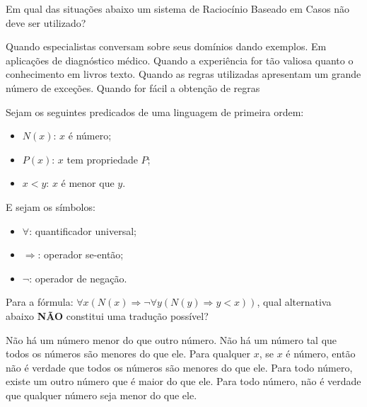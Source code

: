 \documentclass[12pt, addpoints]{exam}
\begin{document}
    \begin{questions}

    \newpage
    \question
Em qual das situações abaixo um sistema de Raciocínio Baseado em Casos não deve ser utilizado?

\begin{choices}
\choice Quando especialistas conversam sobre seus domínios dando exemplos.
\choice Em aplicações de diagnóstico médico.
\choice Quando a experiência for tão valiosa quanto o conhecimento em livros texto.
\choice Quando as regras utilizadas apresentam um grande número de exceções.
\choice Quando for fácil a obtenção de regras
\end{choices}

\question
Sejam os seguintes predicados de uma linguagem de primeira ordem:

\begin{itemize}
    \item \( N(x) \): \( x \) é número;
    \item \( P(x) \): \( x \) tem propriedade \( P \);
    \item \( x < y \): \( x \) é menor que \( y \).
\end{itemize}

E sejam os símbolos:
\begin{itemize}
    \item \( \forall \): quantificador universal;
    \item \( \Rightarrow \): operador se-então;
    \item \( \neg \): operador de negação.
\end{itemize}

Para a fórmula: \( \forall x (N(x) \Rightarrow \neg \forall y (N(y) \Rightarrow y < x)) \), qual alternativa abaixo \textbf{NÃO} constitui uma tradução possível?

\begin{choices}
\choice Não há um número menor do que outro número.
\choice Não há um número tal que todos os números são menores do que ele.
\choice Para qualquer \( x \), se \( x \) é número, então não é verdade que todos os números são menores do que ele.
\choice Para todo número, existe um outro número que é maior do que ele.
\choice Para todo número, não é verdade que qualquer número seja menor do que ele.
\end{choices}


\end{questions}
\end{document}
